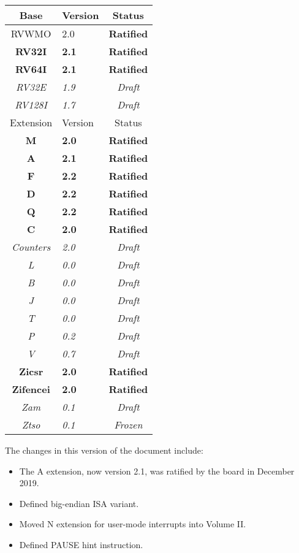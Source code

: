 {
\begin{table}[hbt]
  \centering
  \begin{tabular}{|c|l|c|}
    \hline
    Base           & Version & Status\\
    \hline
    RVWMO          & 2.0 & \bf Ratified   \\
    \bf RV32I      & \bf 2.1 & \bf Ratified \\
    \bf RV64I      & \bf 2.1 & \bf Ratified \\
    \em RV32E      & \em 1.9 & \em Draft \\
    \em RV128I     & \em 1.7 & \em Draft \\
    \hline
    Extension      & Version & Status \\
    \hline
    \bf M          & \bf 2.0 & \bf Ratified \\
    \bf A          & \bf 2.1 & \bf Ratified \\
    \bf F          & \bf 2.2 & \bf Ratified \\
    \bf D          & \bf 2.2 & \bf Ratified \\
    \bf Q          & \bf 2.2 & \bf Ratified \\
    \bf C          & \bf 2.0 & \bf Ratified \\
    \em Counters   & \em 2.0 & \em Draft \\
    \em L          & \em 0.0 & \em Draft \\
    \em B          & \em 0.0 & \em Draft \\
    \em J          & \em 0.0 & \em Draft \\
    \em T          & \em 0.0 & \em Draft \\
    \em P          & \em 0.2 & \em Draft \\
    \em V          & \em 0.7 & \em Draft \\
    \bf Zicsr      & \bf 2.0 & \bf Ratified \\
    \bf Zifencei   & \bf 2.0 & \bf Ratified \\
    \em Zam        & \em 0.1 & \em Draft \\
    \em Ztso       & \em 0.1 & \em Frozen \\
    \hline
  \end{tabular}
\end{table}
}

The changes in this version of the document include:
\vspace{-0.2in}
\begin{itemize}
\parskip 0pt
\itemsep 1pt
\item The A extension, now version 2.1, was ratified by the board in
  December 2019.
\item Defined big-endian ISA variant.
\item Moved N extension for user-mode interrupts into Volume II.
\item Defined PAUSE hint instruction.
\end{itemize}

